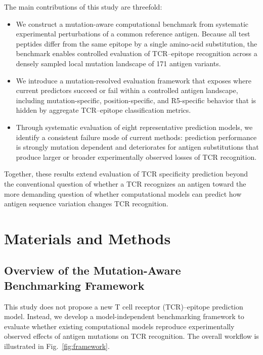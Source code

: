 \documentclass{article}
\begin{document}
The main contributions of this study are threefold:
\begin{itemize}
    \item We construct a mutation-aware computational benchmark from
    systematic experimental perturbations of a common reference antigen.
    Because all test peptides differ from the same epitope by a single
    amino-acid substitution, the benchmark enables controlled evaluation of
    TCR--epitope recognition across a densely sampled local mutation
    landscape of 171 antigen variants.

    \item We introduce a mutation-resolved evaluation framework that exposes where current predictors succeed or fail within a controlled antigen landscape, including mutation-specific, position-specific, and R5-specific behavior that is hidden by aggregate TCR–epitope classification metrics.

    \item Through systematic evaluation of eight representative prediction
    models, we identify a consistent failure mode of current methods:
    prediction performance is strongly mutation dependent and deteriorates
    for antigen substitutions that produce larger or broader experimentally
    observed losses of TCR recognition.
\end{itemize}
Together, these results extend evaluation of TCR specificity prediction
beyond the conventional question of whether a TCR recognizes an antigen
toward the more demanding question of whether computational models can
predict how antigen sequence variation changes TCR recognition.


\section{Materials and Methods}

\subsection{Overview of the Mutation-Aware Benchmarking Framework}

This study does not propose a new T cell receptor (TCR)--epitope prediction
model. Instead, we develop a model-independent benchmarking framework to
evaluate whether existing computational models reproduce experimentally
observed effects of antigen mutations on TCR recognition. The overall workflow
is illustrated in Fig.~\ref{fig:framework}.
\end{document}
